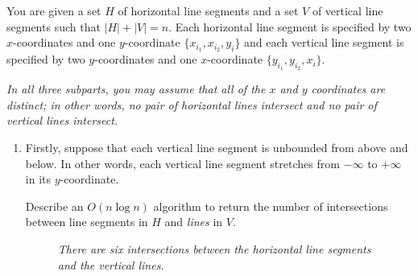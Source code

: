 \documentclass{article}
\begin{document}
\begin{question}
You are given a set $H$ of horizontal line segments and a set $V$ of vertical line segments such that $\lvert H \rvert + \lvert V \rvert = n$. Each horizontal line segment is specified by two $x$-coordinates and one $y$-coordinate $\{x_{i_1}, x_{i_2}, y_i\}$ and each vertical line segment is specified by two $y$-coordinates and one $x$-coordinate $\{y_{i_1}, y_{i_2}, x_i\}$.

{\em In all three subparts, you may assume that all of the $x$ and $y$ coordinates are distinct; in other words, no pair of horizontal lines intersect and no pair of vertical lines intersect.}

\begin{enumerate}[label = (\alph*)]
    \item Firstly, suppose that each vertical line segment is unbounded from above and below. In other words, each vertical line segment stretches from $-\infty$ to $+\infty$ in its $y$-coordinate.

    Describe an $O(n \log n)$ algorithm to return the number of intersections between line segments in $H$ and {\em lines} in $V$.

    \begin{figure}[H]
        \centering
        \caption{{\em There are six intersections between the horizontal line segments and the vertical lines.}}
        \label{fig:enter-label}
    \end{figure}


\end{enumerate}
\end{question}
\end{document}
